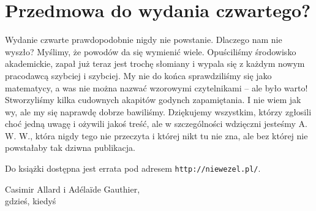 \newpage
\section*{Przedmowa do wydania czwartego?}

Wydanie czwarte prawdopodobnie nigdy nie powstanie.
Dlaczego nam nie wyszło? 
Myślimy, że powodów da się wymienić wiele.
Opuściliśmy środowisko akademickie, zapał już teraz jest trochę słomiany i wypala się z każdym nowym pracodawcą szybciej i szybciej.
My nie do końca sprawdziliśmy się jako matematycy, a was nie można nazwać wzorowymi czytelnikami -- ale było warto!
Stworzyliśmy kilka cudownych akapitów godynch zapamiętania.
I nie wiem jak wy, ale my się naprawdę dobrze bawiliśmy.
Dziękujemy wszystkim, którzy zgłosili choć jedną uwagę i ożywili jakoś treść, ale w szczególności wdzięczni jesteśmy A. W. W., która nigdy tego nie przeczyta i której nikt tu nie zna, ale bez której nie powstałaby tak dziwna publikacja.

Do książki dostępna jest errata pod adresem \texttt{http://niewezel.pl/}.

\begin{flushright}
Casimir Allard i Adélaïde Gauthier,\\gdzieś, kiedyś
\end{flushright}


